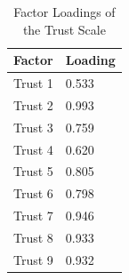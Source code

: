 \begin{appendices}
\begin{table}[h]
\centering
\caption{Factor Loadings of the Trust Scale}
\label{tb:factor_loading}
\small
\begin{threeparttable}
\begin{tabular}{L{60pt}C{60pt}}
\toprule
    Factor & Loading \\ \midrule
    Trust 1 & 0.533  \\
    Trust 2 & 0.993  \\
    Trust 3 & 0.759  \\
    Trust 4 &  0.620 \\
    Trust 5 &  0.805 \\
    Trust 6 & 0.798  \\
    Trust 7 &  0.946 \\
    Trust 8 &  0.933 \\
    Trust 9 &  0.932 \\
    \bottomrule
\end{tabular}
\end{threeparttable}
\end{table}

\clearpage




\end{appendices}